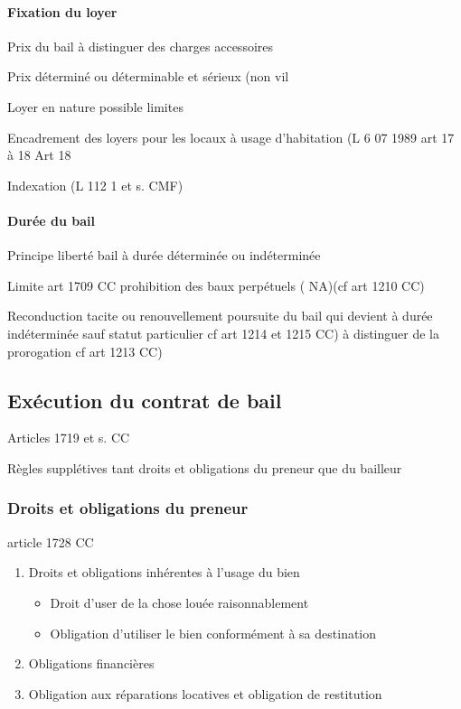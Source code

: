 \documentclass[10pt,a4paper,twoside]{article}
\begin{document}
			\paragraph{Fixation du loyer}

				Prix du bail à distinguer des charges accessoires

				Prix déterminé ou déterminable et sérieux (non vil

				Loyer en nature possible limites

				Encadrement des loyers pour les locaux à usage
				d’habitation (L 6 07 1989 art 17 à 18 Art 18

				Indexation (L 112 1 et s. CMF)

			\paragraph{Durée du bail}

				Principe liberté bail à durée déterminée ou
				indéterminée

				Limite art 1709 CC prohibition des baux
				perpétuels ( NA)(cf art 1210 CC)

				Reconduction tacite ou renouvellement poursuite
				du bail qui devient à durée indéterminée sauf
				statut particulier cf art 1214 et 1215 CC) à
				distinguer de la prorogation cf art 1213 CC)


	\subsection{Exécution du contrat de bail}

		Articles 1719 et s. CC

		Règles supplétives tant droits et obligations du
		preneur que du bailleur

		\subsubsection{Droits et obligations du preneur}

		article 1728 CC
		\begin{enumerate}
			\item Droits et obligations inhérentes à l’usage du bien
			\begin{itemize}
				\item Droit d’user de la chose louée raisonnablement

				\item Obligation d’utiliser le bien conformément à sa
				destination
			\end{itemize}

			\item Obligations financières

			\item Obligation aux réparations locatives et obligation de
			restitution
		\end{enumerate}
\end{document}
